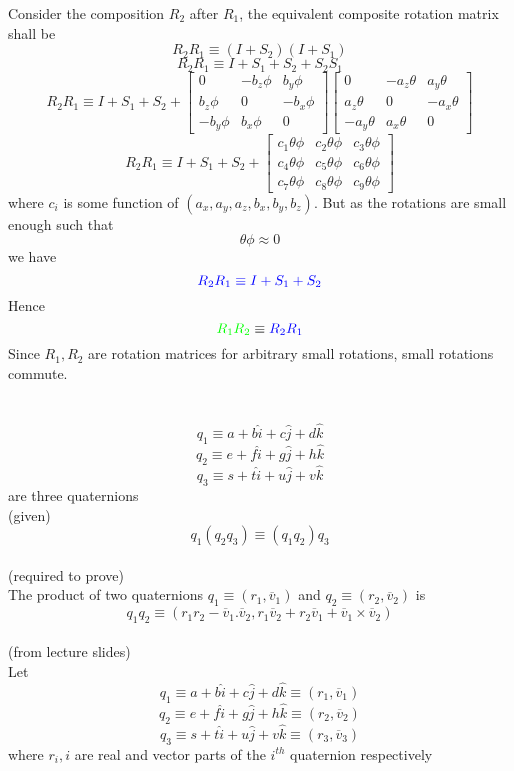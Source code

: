 \documentclass[12pt]{article}
\newcommand{\fromlectures}{{\\ \color{blue} \hspace*{\fill}(from lecture slides)} \\}
\newcommand{\given}{{\\ \color{blue} \hspace*{\fill}(given)} \\}
\newcommand{\rtp}{{\\ \color{blue} \hspace*{\fill}(required to prove)} \\}
\newcommand{\vv}[1]{\overline{v}_{#1}}
\begin{document}
Consider the composition $R_2$ after $R_1$, the equivalent composite rotation matrix shall be
\[
  R_2 R_1 \equiv (I + S_2) (I + S_1)
\]
\[
  R_2 R_1 \equiv I + S_1 + S_2 + S_2S_1
\]
\[
  R_2 R_1 \equiv I + S_1 + S_2 +
  \begin{bmatrix}
    0 & -b_z\phi & b_y\phi\\
     b_z\phi & 0 & -b_x\phi \\
     -b_y\phi & b_x\phi & 0
  \end{bmatrix}
  \begin{bmatrix}
    0 & -a_z\theta & a_y\theta\\
     a_z\theta & 0 & -a_x\theta \\
     -a_y\theta & a_x\theta & 0
  \end{bmatrix}
\]
\[
  R_2 R_1 \equiv I + S_1 + S_2 +
  \begin{bmatrix}
    c_1\theta\phi & c_2\theta\phi & c_3\theta\phi \\
    c_4\theta\phi & c_5\theta\phi & c_6\theta\phi \\
    c_7\theta\phi & c_8\theta\phi & c_9\theta\phi
  \end{bmatrix}
\]
where $c_i$ is some function of $(a_x, a_y, a_z, b_x, b_y, b_z)$. But as the rotations are small enough such that
\[
  \theta\phi \approx 0
\]
we have
\[
  {\color{blue} R_2 R_1 \equiv I + S_1 + S_2}
\]
Hence
\[
  {\color{green} R_1R_2} \equiv {\color{blue} R_2R_1}
\]
Since $R_1, R_2$ are rotation matrices for arbitrary small rotations, small rotations commute.
\pagebreak

\section{}
\[
  q_1 \equiv a + b \hat{i} + c \hat{j} + d \hat{k}
\]
\[
  q_2 \equiv e + f \hat{i} + g \hat{j} + h \hat{k}
\]
\[
  q_3 \equiv s + t \hat{i} + u \hat{j} + v \hat{k}
\]
are three quaternions
\given

\[
  q_1(q_2q_3) \equiv (q_1q_2)q_3
\]
\rtp

The product of two quaternions $ q_1 \equiv (r_1, \vv{1}) $ and $ q_2 \equiv (r_2, \vv{2}) $ is
\[
  q_1q_2 \equiv (r_1 r_2 - \vv{1} . \vv{2}, r_1 \vv{2} + r_2 \vv{1} + \vv{1}\times\vv{2})
\]
\fromlectures

Let
\[
  q_1 \equiv a + b \hat{i} + c \hat{j} + d \hat{k} \equiv (r_1, \vv{1})
\]
\[
  q_2 \equiv e + f \hat{i} + g \hat{j} + h \hat{k} \equiv (r_2, \vv{2})
\]
\[
  q_3 \equiv s + t \hat{i} + u \hat{j} + v \hat{k} \equiv (r_3, \vv{3})
\]
where $r_i, i$ are real and vector parts of the $i^{th}$ quaternion respectively
\end{document}
